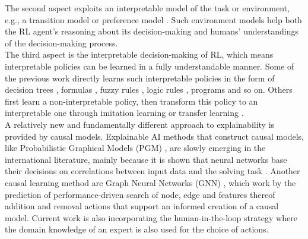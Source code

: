 \documentclass[twoside,11pt]{article}
\begin{document}
The second aspect exploits an interpretable model of the task or environment, e.g., a transition model \citep{martinez2016learning,zhu2020object} or preference model \citep{toro2019learning,icarte2018using}. Such environment models help both the RL agent's reasoning about its decision-making and humans' understandings of the decision-making process.\\

The third aspect is the interpretable decision-making of RL, which means interpretable policies can be learned in a fully understandable manner. Some of the previous work directly learns such interpretable policies in the form of decision trees \citep{likmeta2020combining,silva2020optimization,topin2021iterative}, formulas \citep{hein2018interpretable,hein2019generating}, fuzzy rules \citep{zhang2021kogun,akrour2019towards,hein2017particle}, logic rules \citep{jiang2019neural}, programs \citep{verma2019imitation,sun2019program} and so on. Others first learn a non-interpretable policy, then transform this policy to an interpretable one through imitation learning or transfer learning \citep{VermaEtAl:2018:ProgrammaticallyInterpretableRL,bastani2018verifiable}.\\



A relatively new and fundamentally different approach to explainability is provided by causal models. Explainable AI methods that construct causal models, like Probabilistic Graphical Models (PGM) \cite{Koller:2009:ProbabilisticGraphicalModelsBook}, \cite{Saranti:2019:LearningCompetencePGMs} are slowly emerging in the international literature, mainly because it is shown that neural networks base their decisions on correlations between input data and the solving task \cite{Lapuschkin:2019:UnmaskingCleverHans}. 
Another causal learning method are Graph Neural Networks (GNN) \cite{Vu:2020:PGMExplainer}, which work by the prediction of performance-driven search of node, edge and features thereof addition and removal actions that support an informed creation of a causal model. Current work is also incorporating the human-in-the-loop strategy \cite{Holzinger:2016:iML} where the domain knowledge of an expert is also used for the choice of actions. 
\end{document}
